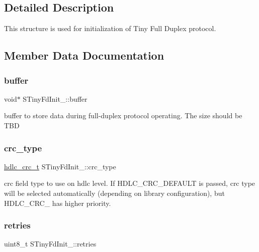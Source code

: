 \subsection{Detailed Description}
This structure is used for initialization of Tiny Full Duplex protocol. 

\subsection{Member Data Documentation}
\mbox{\label{structSTinyFdInit___a7ffe2a907dc18e66e84507b1620c7bfa}} 
\subsubsection{\texorpdfstring{buffer}{buffer}}
{\footnotesize\ttfamily void$\ast$ S\+Tiny\+Fd\+Init\+\_\+\+::buffer}

buffer to store data during full-\/duplex protocol operating. The size should be T\+BD \mbox{\label{structSTinyFdInit___a7a0bb8f1faf2c8adac2ac8ed5dcb5afd}} 
\subsubsection{\texorpdfstring{crc\+\_\+type}{crc\_type}}
{\footnotesize\ttfamily \hyperlink{group__HDLC__API_gabb73b32d08d8e79eefe9385634a74bf7}{hdlc\+\_\+crc\+\_\+t} S\+Tiny\+Fd\+Init\+\_\+\+::crc\+\_\+type}

crc field type to use on hdlc level. If H\+D\+L\+C\+\_\+\+C\+R\+C\+\_\+\+D\+E\+F\+A\+U\+LT is passed, crc type will be selected automatically (depending on library configuration), but H\+D\+L\+C\+\_\+\+C\+R\+C\+\_ has higher priority. \mbox{\label{structSTinyFdInit___acaf92c5f021e949607bb7ce161d029e9}} 
\subsubsection{\texorpdfstring{retries}{retries}}
{\footnotesize\ttfamily uint8\+\_\+t S\+Tiny\+Fd\+Init\+\_\+\+::retries}

